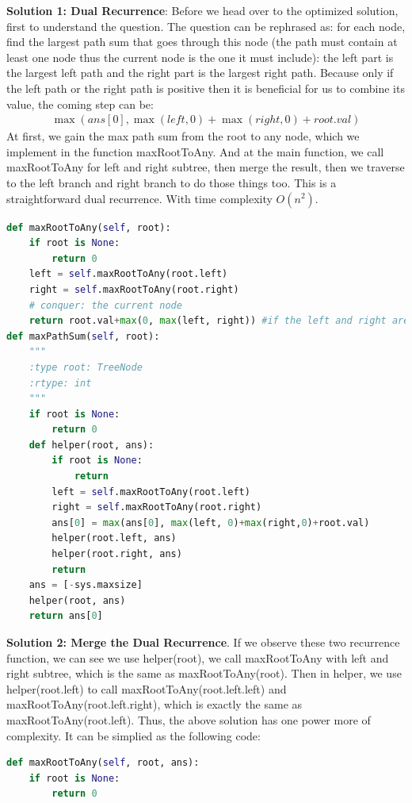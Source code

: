 \documentclass[../main.tex]{subfiles}
\begin{document}
\begin{examples}[resume]
\textbf{Solution 1: Dual Recurrence}: Before we head over to the optimized solution, first to understand the question. The question can be rephrased as: for each node, find the largest path sum that goes through this node (the path must contain at least one node thus the current node is the one it must include): the left part is the largest left path and the right part is the largest right path. Because only if the left path or the right path is positive then it is beneficial for us to combine its value, the coming step can be:
\begin{align}
  \max(ans[0], \max(left, 0)+\max(right,0) + root.val)  
\end{align}
At first, we gain the max path sum from the root to any node, which we implement in the function maxRootToAny. And at the main function, we call maxRootToAny for left and right subtree, then merge the result, then we traverse to the left branch and right branch to do those things too. This is a straightforward dual recurrence. With time complexity $O(n^2)$.
\begin{lstlisting}[language=Python]
def maxRootToAny(self, root):
    if root is None:
        return 0
    left = self.maxRootToAny(root.left)
    right = self.maxRootToAny(root.right)
    # conquer: the current node
    return root.val+max(0, max(left, right)) #if the left and right are both negative, we get rid of it
def maxPathSum(self, root):
    """
    :type root: TreeNode
    :rtype: int
    """
    if root is None:
        return 0
    def helper(root, ans):
        if root is None:
            return
        left = self.maxRootToAny(root.left)
        right = self.maxRootToAny(root.right)
        ans[0] = max(ans[0], max(left, 0)+max(right,0)+root.val)
        helper(root.left, ans)
        helper(root.right, ans)
        return 
    ans = [-sys.maxsize]
    helper(root, ans)
    return ans[0]
\end{lstlisting}
\textbf{Solution 2: Merge the Dual Recurrence}. If we observe these two recurrence function, we can see we use helper(root), we call maxRootToAny with left and right subtree, which is the same as maxRootToAny(root). Then in helper, we use helper(root.left) to call maxRootToAny(root.left.left) and maxRootToAny(root.left.right), which is exactly the same as maxRootToAny(root.left). Thus, the above solution has one power more of complexity. It can be simplied as the following code:
\begin{lstlisting}[language=Python]
def maxRootToAny(self, root, ans):
    if root is None:
        return 0

\end{lstlisting}
\end{examples}
\end{document}
